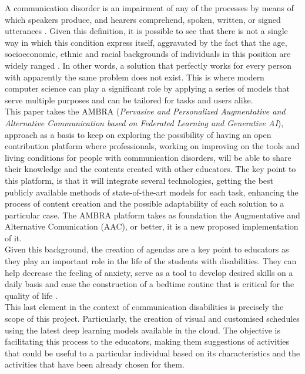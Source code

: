 \documentclass[10pt,twocolumn,letterpaper]{article}
\begin{document}
A communication disorder is an impairment of any of the processes by means of which speakers produce, and hearers comprehend, spoken, written, or signed utterances \cite{Cummings2023}. Given this definition, it is possible to see that there is not a single way in which this condition express itself, aggravated by the fact that the age, socioeconomic, ethnic and racial backgrounds of individuals in this position are widely ranged \cite{AAC}. In other words, a solution that perfectly works for every person with apparently the same problem does not exist. This is where modern computer science can play a significant role by applying a series of models that serve multiple purposes and can be tailored for tasks and users alike. \\

This paper takes the AMBRA (\textit{Pervasive and Personalized
Augmentative and Alternative Communication based on
Federated Learning and Generative AI}), approach \cite{AMBRA} as a basis to keep on exploring the possibility of having an open contribution platform where professionals, working on improving on the tools and living conditions for people with communication disorders, will be able to share their knowledge and the contents created with other educators. The key point to this platform, is that it will integrate several technologies, getting the best publicly available methods of state-of-the-art models for each task, enhancing the process of content creation and the possible adaptability of each solution to a particular case. The AMBRA platform takes as foundation the Augmentative and Alternative Comunication (AAC), or better, it is a new proposed implementation of it.\\
 
Given this background, the creation of agendas are a key point to educators as they play an important role in the life of the students with disabilities. They can help decrease the feeling of anxiety, serve as a tool to develop desired skills on a daily basis and ease the construction of a bedtime routine that is critical for the quality of life \cite{tomato}. \\

This last element in the context of communication disabilities is precisely the scope of this project. Particularly, the creation of visual and customised schedules using the latest deep learning models available in the cloud. The objective is facilitating this process to the educators, making them suggestions of activities that could be useful to a particular individual based on its characteristics and the activities that have been already chosen for them. \\
\end{document}
